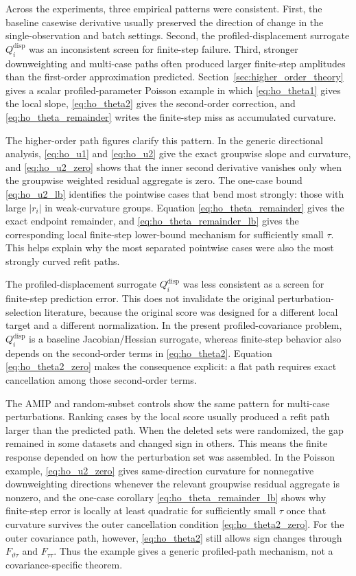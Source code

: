 
Across the experiments, three empirical patterns were consistent. First, the baseline casewise derivative usually preserved the direction of change in the single-observation and batch settings. Second, the profiled-displacement surrogate \(Q_i^{\mathrm{disp}}\) was an inconsistent screen for finite-step failure. Third, stronger downweighting and multi-case paths often produced larger finite-step amplitudes than the first-order approximation predicted. Section~\ref{sec:higher_order_theory} gives a scalar profiled-parameter Poisson example in which \eqref{eq:ho_theta1} gives the local slope, \eqref{eq:ho_theta2} gives the second-order correction, and \eqref{eq:ho_theta_remainder} writes the finite-step miss as accumulated curvature.

The higher-order path figures clarify this pattern. In the generic directional analysis, \eqref{eq:ho_u1} and \eqref{eq:ho_u2} give the exact groupwise slope and curvature, and \eqref{eq:ho_u2_zero} shows that the inner second derivative vanishes only when the groupwise weighted residual aggregate is zero. The one-case bound \eqref{eq:ho_u2_lb} identifies the pointwise cases that bend most strongly: those with large \(|r_i|\) in weak-curvature groups. Equation \eqref{eq:ho_theta_remainder} gives the exact endpoint remainder, and \eqref{eq:ho_theta_remainder_lb} gives the corresponding local finite-step lower-bound mechanism for sufficiently small \(\tau\). This helps explain why the most separated pointwise cases were also the most strongly curved refit paths.

The profiled-displacement surrogate \(Q_i^{\mathrm{disp}}\) was less consistent as a screen for finite-step prediction error. This does not invalidate the original perturbation-selection literature, because the original score was designed for a different local target and a different normalization. In the present profiled-covariance problem, \(Q_i^{\mathrm{disp}}\) is a baseline Jacobian/Hessian surrogate, whereas finite-step behavior also depends on the second-order terms in \eqref{eq:ho_theta2}. Equation \eqref{eq:ho_theta2_zero} makes the consequence explicit: a flat path requires exact cancellation among those second-order terms.

The AMIP and random-subset controls show the same pattern for multi-case perturbations. Ranking cases by the local score usually produced a refit path larger than the predicted path. When the deleted sets were randomized, the gap remained in some datasets and changed sign in others. This means the finite response depended on how the perturbation set was assembled. In the Poisson example, \eqref{eq:ho_u2_zero} gives same-direction curvature for nonnegative downweighting directions whenever the relevant groupwise residual aggregate is nonzero, and the one-case corollary \eqref{eq:ho_theta_remainder_lb} shows why finite-step error is locally at least quadratic for sufficiently small \(\tau\) once that curvature survives the outer cancellation condition \eqref{eq:ho_theta2_zero}. For the outer covariance path, however, \eqref{eq:ho_theta2} still allows sign changes through \(F_{\vartheta\tau}\) and \(F_{\tau\tau}\). Thus the example gives a generic profiled-path mechanism, not a covariance-specific theorem.

